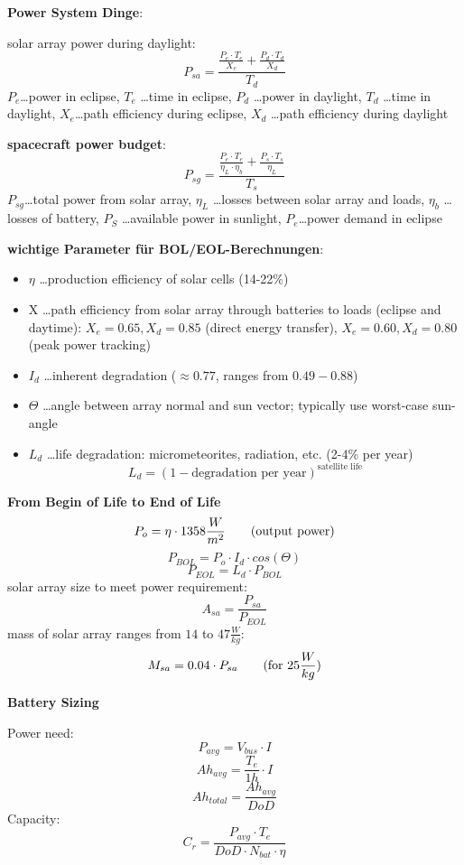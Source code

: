 \documentclass[a4paper,10pt]{article}
\newcommand{\f}{\textbf}
\begin{document}
\noindent \f{Power System Dinge}:\\
\vspace*{3pt}

\noindent solar array power during daylight:
\[P_{sa} = \frac{\frac{P_e\cdot T_e}{X_e}+ \frac{P_d\cdot T_d}{X_d}}{T_d}\]
$P_e$\dots power in eclipse, $T_e$ \dots time in eclipse, $P_d$ \dots power in daylight, $T_d$ \dots time in daylight, $X_e$\dots path efficiency during eclipse, $X_d$ \dots path 
efficiency during daylight\\
\vspace*{5pt}

\noindent \f{spacecraft power budget}:
\[P_{sg} = \frac{\frac{P_e\cdot T_e}{\eta_L\cdot \eta_b}+ \frac{P_s\cdot T_s}{\eta_L}}{T_s}\]
$P_{sg}$\dots total power from solar array, $\eta_L$ \dots losses between solar array and loads, $\eta_b$ \dots losses of battery, $P_S$ \dots available power in sunlight, $P_e$\dots power demand in 
eclipse\\
\vspace*{3pt}

\noindent \f{wichtige Parameter für BOL/EOL-Berechnungen}:
\begin{itemize}
 \item $\eta$ \dots production efficiency of solar cells (14-22\%)
 \item X \dots path efficiency from solar array through batteries to loads (eclipse and daytime): $X_e=0.65, X_d=0.85$ (direct energy transfer), $X_e=0.60, X_d=0.80$ (peak power tracking)
 \item $I_d$ \dots inherent degradation ($\approx 0.77$, ranges from $0.49-0.88$)
 \item $\Theta$ \dots angle between array normal and sun vector; typically use worst-case sun-angle
 \item $L_d$ \dots life degradation: micrometeorites, radiation, etc. (2-4\% per year)\[L_d = (1-\text{degradation per year})^{\text{satellite life}}\]
\end{itemize}

\vspace*{5pt}

\noindent \f{From Begin of Life to End of Life}
\[P_{o} = \eta\cdot 1358\frac{W}{m^2} \text{\qquad (output power)}\]
\[P_{BOL} = P_o\cdot I_d\cdot cos(\Theta)\]
\[P_{EOL} = L_d\cdot P_{BOL}\]
solar array size to meet power requirement:
\[A_{sa} = \frac{P_{sa}}{P_{EOL}}\]
mass of solar array ranges from $14$ to $47 \frac{W}{kg}$:
\[M_{sa} = 0.04\cdot P_{sa} \text{\qquad (for } 25 \frac{W}{kg})\]

\noindent \f{Battery Sizing}\\
\vspace*{3pt}

\noindent Power need:
\[P_{avg} = V_{bus}\cdot I\]
\[Ah_{avg} = \frac{T_e}{1h}\cdot I\]
\[Ah_{total} = \frac{Ah_{avg}}{DoD}\]
Capacity:
\[C_r = \frac{P_{avg}\cdot T_e}{DoD\cdot N_{bat} \cdot \eta}\]
\end{document}
